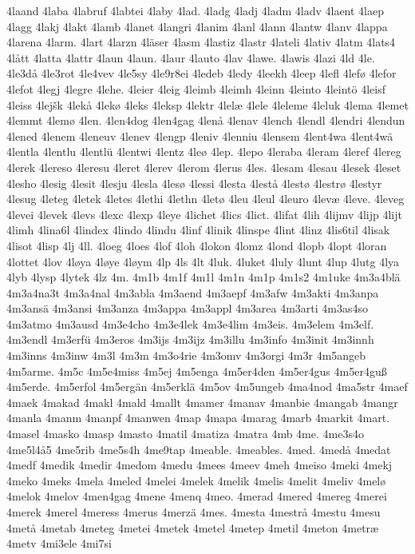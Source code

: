 4laand
4laba
4labruf
4labtei
4laby
4lad.
4ladg
4ladj
4ladm
4ladv
4laent
4laep
4lagg
4lakj
4lakt
4lamb
4lanet
4langri
4lanim
4lanl
4lann
4lantw
4lanv
4lappa
4larena
4larm.
4lart
4larzn
4läser
4lasm
4lastiz
4lastr
4lateli
4lativ
4latm
4lats4
4lått
4latta
4lattr
4laun
4laun.
4laur
4lauto
4lav
4lawe.
4lawis
4lazi
4ld
4le.
4le3då
4le3rot
4le4vev
4le5sy
4le9r8ei
4ledeb
4ledy
4leekh
4leep
4lefl
4lefø
4lefor
4lefot
4legj
4legre
4lehe.
4leier
4leig
4leimb
4leimh
4leinn
4leinto
4leintö
4leisf
4leiss
4lejšk
4lekå
4lekø
4leks
4leksp
4lektr
4lelæ
4lele
4leleme
4leluk
4lema
4lemet
4lemmt
4lemø
4len.
4len4dog
4len4gag
4lenå
4lenav
4lench
4lendl
4lendri
4lendun
4lened
4lenem
4leneuv
4lenev
4lengp
4leniv
4lenniu
4lensem
4lent4wa
4lent4wä
4lentla
4lentlu
4lentlü
4lentwi
4lentz
4leø
4lep.
4lepo
4leraba
4leram
4leref
4lereg
4lerek
4lereso
4leresu
4leret
4lerev
4lerom
4lerus
4les.
4lesam
4lesau
4lesek
4leset
4lesho
4lesig
4lesit
4lesju
4lesla
4lesø
4lessi
4lesta
4lestå
4lestø
4lestrø
4lestyr
4lesug
4leteg
4letek
4letes
4lethi
4lethn
4letø
4leu
4leul
4leuro
4levæ
4leve.
4leveg
4levei
4levek
4levs
4lexc
4lexp
4leye
4lichet
4lics
4lict.
4lifat
4lih
4lijmv
4lijp
4lijt
4limh
4lina6l
4lindex
4lindo
4lindu
4linf
4linik
4linspe
4lint
4linz
4lis6til
4lisak
4lisot
4lisp
4lj
4ll.
4loeg
4loes
4lof
4loh
4lokon
4lomz
4lond
4lopb
4lopt
4loran
4lottet
4lov
4løya
4løye
4løym
4lp
4ls
4lt
4luk.
4luket
4luly
4lunt
4lup
4lutg
4lya
4lyb
4lysp
4lytek
4lz
4m.
4m1b
4m1f
4m1l
4m1n
4m1p
4m1s2
4m1uke
4m3a4blä
4m3a4na3t
4m3a4nal
4m3abla
4m3aend
4m3aepf
4m3afw
4m3akti
4m3anpa
4m3ansä
4m3ansi
4m3anza
4m3appa
4m3appl
4m3area
4m3arti
4m3as4so
4m3atmo
4m3ausd
4m3e4cho
4m3e4lek
4m3e4lim
4m3eis.
4m3elem
4m3elf.
4m3endl
4m3erfü
4m3eros
4m3ijs
4m3ijz
4m3illu
4m3info
4m3init
4m3innh
4m3inns
4m3inw
4m3l
4m3m
4m3o4rie
4m3omv
4m3orgi
4m3r
4m5angeb
4m5arme.
4m5c
4m5e4miss
4m5ej
4m5enga
4m5er4den
4m5er4gus
4m5er4guß
4m5erde.
4m5erfol
4m5ergän
4m5erklä
4m5ov
4m5ungeb
4ma4nod
4ma5str
4maef
4maek
4makad
4makl
4mald
4mallt
4mamer
4manav
4manbie
4mangab
4mangr
4manla
4manm
4manpf
4manwen
4map
4mapa
4marag
4marb
4markit
4mart.
4masel
4masko
4masp
4masto
4matil
4matiza
4matra
4mb
4me.
4me3s4o
4me5l4å5
4me5rib
4me5s4h
4me9tap
4meable.
4meables.
4med.
4medå
4medat
4medf
4medik
4medir
4medom
4medu
4mees
4meev
4meh
4meiso
4meki
4mekj
4meko
4meks
4mela
4meled
4melei
4melek
4melik
4melis
4melit
4meliv
4melø
4melok
4melov
4men4gag
4mene
4menq
4meo.
4merad
4mered
4mereg
4merei
4merek
4merel
4meress
4merus
4merzä
4mes.
4mesta
4mestrå
4mestu
4mesu
4metå
4metab
4meteg
4metei
4metek
4metel
4metep
4metil
4meton
4metræ
4metv
4mi3ele
4mi7si
